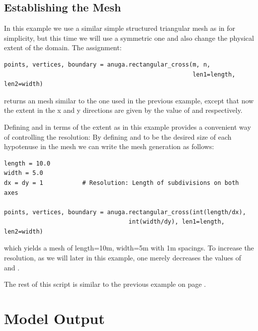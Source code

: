 \documentclass{manual}
\begin{document}
\subsection{Establishing the Mesh}

In this example we use a similar simple structured triangular mesh as in 
for simplicity, but this time we will use a symmetric one and also
change the physical extent of the domain. The assignment:

\begin{verbatim}
points, vertices, boundary = anuga.rectangular_cross(m, n, 
                                                     len1=length, len2=width)
\end{verbatim}

returns an  mesh similar to the one used in the previous example, except that now the
extent in the x and y directions are given by the value of  and 
respectively.

Defining  and  in terms of the extent as in this example provides a convenient way of
controlling the resolution: By defining  and  to be the desired size of each
hypotenuse in the mesh we can write the mesh generation as follows:

\begin{verbatim}
length = 10.0
width = 5.0
dx = dy = 1           # Resolution: Length of subdivisions on both axes

points, vertices, boundary = anuga.rectangular_cross(int(length/dx), 
                                   int(width/dy), len1=length, len2=width)
\end{verbatim}

which yields a mesh of length=10m, width=5m with 1m spacings. To increase the resolution,
as we will later in this example, one merely decreases the values of  and .

The rest of this script is similar to the previous example on page \pageref{ref:runup_py_code}.


\section{Model Output}
\end{document}
